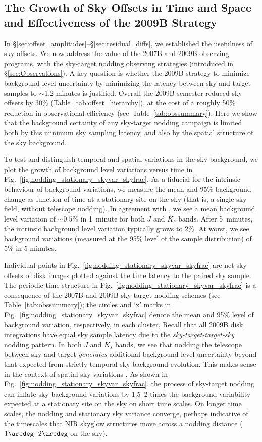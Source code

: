 \documentclass[iop,tighten]{emulateapj}
\newcommand{\Fig}[1]{Fig.~\ref{fig:#1}}  %
\newcommand{\Tab}[1]{Table~\ref{tab:#1}}  %
\newcommand{\Sec}[1]{\S\ref{sec:#1}}  %
\begin{document}
\subsection{The Growth of Sky Offsets in Time and Space and Effectiveness of the 2009B Strategy}
\label{sec:offsetevo}

In \Sec{offset_amplitudes}--\Sec{residual_diffs}, we established the usefulness of sky offsets.
We now address the value of the 2007B and 2009B observing programs, with the sky-target nodding observing strategies (introduced in \Sec{Observations}).
A key question is whether the 2009B strategy to minimize background level uncertainty by minimizing the latency between sky and target samples to $\sim$1.2 minutes is justified.
Overall the 2009B semester reduced sky offsets by 30\% (\Tab{offset_hierarchy}), at the cost of a roughly 50\% reduction in observational efficiency (see~\Tab{obssummary}).
Here we show that the background certainty of any sky-target nodding campaign is limited both by this minimum sky sampling latency, and also by the spatial structure of the sky background.

To test and distinguish temporal and spatial variations in the sky background, we plot the growth of background level variations versus time in \Fig{nodding_stationary_skyvar_skyfrac}.
As a fiducial for the intrinsic behaviour of background variations, we measure the mean and 95\% background change as function of time at a stationary site on the sky (that is, a single sky field, without telescope nodding).
In agreement with \cite{Vaduvescu:2004}, we see a mean background level variation of $\sim 0.5\%$ in 1~minute for both $J$ and $K_s$ bands.
After 5~minutes, the intrinsic background level variation typically grows to 2\%.
At worst, we see background variations (measured at the 95\% level of the sample distribution) of 5\% in 5 minutes.

Individual points in \Fig{nodding_stationary_skyvar_skyfrac} are net sky offsets of disk images plotted against the time latency to the paired sky sample.
The periodic time structure in \Fig{nodding_stationary_skyvar_skyfrac} is a consequence of the 2007B and 2009B sky-target nodding schemes (see \Tab{obssummary}); the circles and `x' marks in \Fig{nodding_stationary_skyvar_skyfrac} denote the mean and 95\% level of background variation, respectively, in each cluster.
Recall that all 2009B disk integrations have equal sky sample latency due to the \emph{sky-target-target-sky} nodding pattern.
In both $J$ and $K_s$ bands, we see that nodding the telescope between sky and target \emph{generates} additional background level uncertainty beyond that expected from strictly temporal sky background evolution.
This makes sense in the context of spatial sky variations \citep{Adams:1996}.
As shown in \Fig{nodding_stationary_skyvar_skyfrac}, the process of sky-target nodding can inflate sky background variations by 1.5--2 times the background variability expected at a stationary site on the sky on short time scales.
On longer time scales, the nodding and stationary sky variance converge, perhaps indicative of the timescales that NIR skyglow structures move across a nodding distance ($1\arcdeg$--$2\arcdeg$ on the sky).
\end{document}

